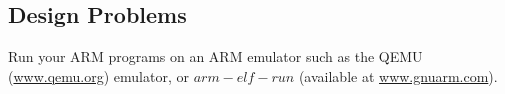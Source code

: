 \subsection*{Design Problems}

\begin{ExerciseList}
\Exercise
Run your ARM programs on an ARM emulator such as the QEMU (\url{www.qemu.org}) emulator, or $arm-elf-run$ (available at \url{www.gnuarm.com}).

\end{ExerciseList}



















